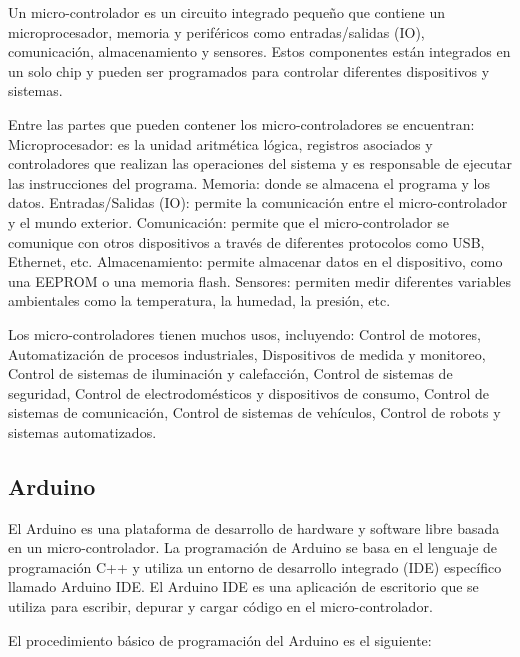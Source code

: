 Un micro-controlador es un circuito integrado pequeño que contiene un microprocesador, memoria y periféricos como entradas/salidas (IO), comunicación, almacenamiento y sensores. Estos componentes están integrados en un solo chip y pueden ser programados para controlar diferentes dispositivos y sistemas.

Entre las partes que pueden contener los micro-controladores se encuentran: Microprocesador: es la unidad aritmética lógica,  registros asociados y controladores  que realizan  las operaciones del sistema y es responsable de ejecutar las instrucciones del programa.
Memoria: donde se almacena el programa y los datos.
Entradas/Salidas (IO): permite la comunicación entre el micro-controlador y el mundo exterior.
Comunicación: permite que el micro-controlador se comunique con otros dispositivos a través de diferentes protocolos como USB, Ethernet, etc.
Almacenamiento: permite almacenar datos en el dispositivo, como una EEPROM o una memoria flash.
Sensores: permiten medir diferentes variables ambientales como la temperatura, la humedad, la presión, etc.

Los micro-controladores tienen muchos usos, incluyendo: Control de motores,
Automatización de procesos industriales,
Dispositivos de medida y monitoreo,
Control de sistemas de iluminación y calefacción,
Control de sistemas de seguridad,
Control de electrodomésticos y dispositivos de consumo,
Control de sistemas de comunicación,
Control de sistemas de vehículos,
Control de robots y sistemas automatizados.

\subsection{Arduino}

El Arduino es una plataforma de desarrollo de hardware y software libre basada en un micro-controlador. La programación de Arduino se basa en el lenguaje de programación C++ y utiliza un entorno de desarrollo integrado (IDE) específico llamado Arduino IDE. El Arduino IDE es una aplicación de escritorio que se utiliza para escribir, depurar y cargar código en el micro-controlador.

El procedimiento básico de programación del Arduino es el siguiente:

